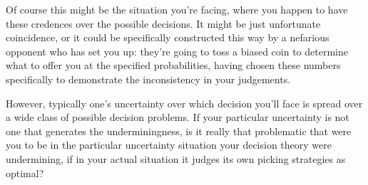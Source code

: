 \documentclass[a4paper]{article}
\newcommand{\todoold}[2][]{\todo[backgroundcolor=white,bordercolor=orange!10,linecolor=gray!10, #1,caption={},textcolor=gray]{Pre-rev: #2}}
\renewcommand{\color}[1]{}
\newenvironment{colored}[1]{\leavevmode\color{#1}}{}
\newenvironment{CCM rewritten}
{\begingroup\color{blue}} %
{\endgroup}              %
\begin{document}
	Of course this might be the situation you're facing, where you happen to have these credences over the possible decisions. It might be just unfortunate coincidence, or it could be specifically constructed this way by a nefarious opponent who has set you up: they're going to toss a biased coin to determine what to offer you at the specified probabilities, having chosen these numbers specifically to demonstrate the inconsistency in your judgements. 
	
	However, typically one's uncertainty over which decision you'll face is spread over a wide class of possible decision problems. If your particular uncertainty is not one that generates the underminingness, is it really that problematic that were you to be in the particular uncertainty situation your decision theory were undermining, if in your actual situation it judges its own picking strategies as optimal?
	
	


%
%
\end{document}
